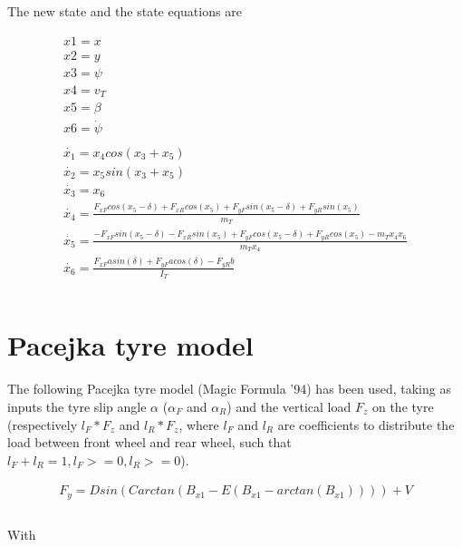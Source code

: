 \documentclass{report}
\let\Oldsection\section
\renewcommand{\section}{\FloatBarrier\Oldsection}
\begin{document}
The new state and the state equations are

\begin{equation}
\begin{aligned}
x1 = x\\
x2 = y\\
x3 = \psi\\
x4 = v_T\\
x5 = \beta\\
x6 = \dot{\psi}\\\\
\dot{x_1} = x_4 cos(x_3 + x_5)\\
\dot{x_2} = x_5 sin(x_3 + x_5)\\
\dot{x_3} = x_6 \\
\dot{x_4} = \frac{F_{xF} cos(x_5-\delta) + F_{xR} cos(x_5) + F_{yF} sin(x_5-\delta) + F_{yR} sin(x_5)}{m_T} \\
\dot{x_5} = \frac{-F_{xF} sin(x_5-\delta) - F_{xR} sin(x_5) + F_{yF} cos(x_5-\delta) + F_{yR} cos(x_5) - m_T x_4 x_6}{m_T x_4} \\
\dot{x_6} = \frac{F_{xF} a sin(\delta) + F_{yF} a cos(\delta) - F_{yR} b}{I_T} \\\\
\end{aligned}
\end{equation}

\section{Pacejka tyre model}

The following Pacejka tyre model (Magic Formula '94) has been used, taking as inputs the tyre slip angle $\alpha$ ($\alpha_F$ and $\alpha_R$) and the vertical load $F_z$ on the tyre (respectively $l_F*F_z$ and $l_R*F_z$, where $l_F$ and $l_R$ are coefficients to distribute the load between front wheel and rear wheel, such that $l_F+l_R=1, l_F>=0, l_R>=0$).

\begin{equation}
\begin{aligned}
F_y = D sin (C arctan (B_{x1} - E (B_{x1} - arctan(B_{x1})))) + V\\\\
\end{aligned}
\end{equation}

With
\end{document}
